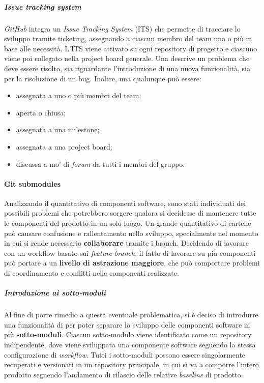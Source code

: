 		\subparagraph{Issue tracking system}

		\textit{GitHub} integra un \textit{Issue Tracking System} (ITS) che permette di tracciare lo sviluppo tramite ticketing, assegnando a ciascun membro del team una o più  in base alle necessità.
		\newline
		L'ITS viene attivato su ogni repository di progetto e ciascuno viene poi collegato nella project board generale.
		\newline
		Una  descrive un problema che deve essere risolto, sia riguardante l'introduzione di una nuova funzionalità, sia per la risoluzione di un bug. Inoltre, una qualunque  può essere:
		\begin{itemize}
			\item assegnata a uno o più membri del team;
			\item aperta o chiusa;
			\item assegnata a una milestone;
			\item assegnata a una project board;
			\item discussa a mo' di \textit{forum} da tutti i membri del gruppo.
		\end{itemize}


	\paragraph{Git submodules}

	Analizzando il quantitativo di componenti software, sono stati individuati dei possibili problemi che potrebbero sorgere qualora si decidesse di mantenere tutte le componenti del prodotto in un solo luogo.
	\newline
	Un grande quantitativo di cartelle può causare confusione e rallentamento nello sviluppo, specialmente nel momento in cui si rende necessario \textbf{collaborare} tramite i branch.
	\newline
	Decidendo di lavorare con un workflow basato sui \textit{feature branch}, il fatto di lavorare su più componenti può portare a un \textbf{livello di astrazione maggiore}, che può comportare problemi di coordinamento e conflitti nelle componenti realizzate.

		\subparagraph{Introduzione ai sotto-moduli}

		Al fine di porre rimedio a questa eventuale problematica, si è deciso di introdurre una funzionalità di  per poter separare lo sviluppo delle componenti software in più \textbf{sotto-moduli}.
		\newline
		Ciascun sotto-modulo viene identificato come un repository indipendente, dove viene sviluppata una componente software seguendo la stessa configurazione di \textit{workflow}.
		\newline
		Tutti i sotto-moduli possono essere singolarmente recuperati e versionati in un repository principale, in cui si va a comporre l'intero prodotto seguendo l'andamento di rilascio delle relative \textit{baseline} di prodotto.

